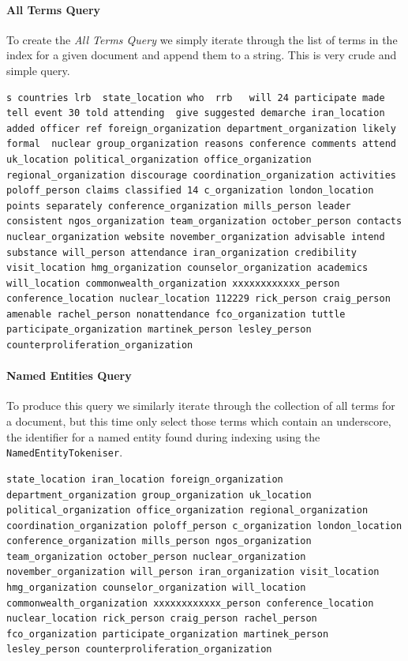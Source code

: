 \documentclass{l4proj}
\newcommand{\code}[1]{\texttt{#1}}
\newenvironment{codelisting}{\captionsetup{type=listing}}{}
\begin{document}
\paragraph{All Terms Query}
To create the \textit{All Terms Query} we simply iterate through the list of terms in the index for a given document and append them to a string. This is very crude and simple query.
\begin{codelisting}
\begin{verbatim}
s countries lrb  state_location who  rrb   will 24 participate made tell event 30 told attending  give suggested demarche iran_location added officer ref foreign_organization department_organization likely formal  nuclear group_organization reasons conference comments attend uk_location political_organization office_organization regional_organization discourage coordination_organization activities poloff_person claims classified 14 c_organization london_location points separately conference_organization mills_person leader consistent ngos_organization team_organization october_person contacts nuclear_organization website november_organization advisable intend substance will_person attendance iran_organization credibility visit_location hmg_organization counselor_organization academics will_location commonwealth_organization xxxxxxxxxxxx_person conference_location nuclear_location 112229 rick_person craig_person amenable rachel_person nonattendance fco_organization tuttle participate_organization martinek_person lesley_person counterproliferation_organization
\end{verbatim}
\label{code:all_terms_query}
\end{codelisting}
\paragraph{Named Entities Query}
To produce this query we similarly iterate through the collection of all terms for a document, but this time only select those terms which contain an underscore, the identifier for a named entity found during indexing using the \code{NamedEntityTokeniser}.
\begin{codelisting}
\begin{verbatim}
state_location iran_location foreign_organization department_organization group_organization uk_location political_organization office_organization regional_organization coordination_organization poloff_person c_organization london_location conference_organization mills_person ngos_organization team_organization october_person nuclear_organization november_organization will_person iran_organization visit_location hmg_organization counselor_organization will_location commonwealth_organization xxxxxxxxxxxx_person conference_location nuclear_location rick_person craig_person rachel_person fco_organization participate_organization martinek_person lesley_person counterproliferation_organization
\end{verbatim}
\label{code:ne_query}
\end{codelisting}
\end{document}
